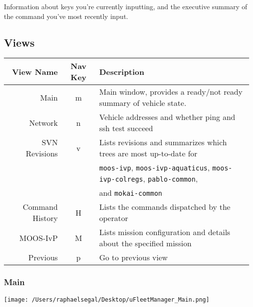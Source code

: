 \documentclass[11pt]{article}
\begin{document}
Information about keys you're currently inputting, and the executive summary of the command you've most recently input.
\subsection{Views}
\begin{tabular}{r|cl}
View Name & Nav Key & Description\\
\hline
Main & m & Main window, provides a ready/not ready summary of vehicle state.\\
Network & n & Vehicle addresses and whether ping and ssh test succeed\\
SVN Revisions & v & Lists revisions and summarizes which trees are most up-to-date for\\&& \texttt{moos-ivp}, \texttt{moos-ivp-aquaticus}, \texttt{moos-ivp-colregs}, \texttt{pablo-common},\\
&& and \texttt{mokai-common}\\
Command History & H & Lists the commands dispatched by the operator\\
MOOS-IvP & M & Lists mission configuration and details about the specified mission\\
Previous & p & Go to previous view\\
\end{tabular}
\subsubsection{Main}
\texttt{[image: /Users/raphaelsegal/Desktop/uFleetManager\_Main.png]}
\end{document}
